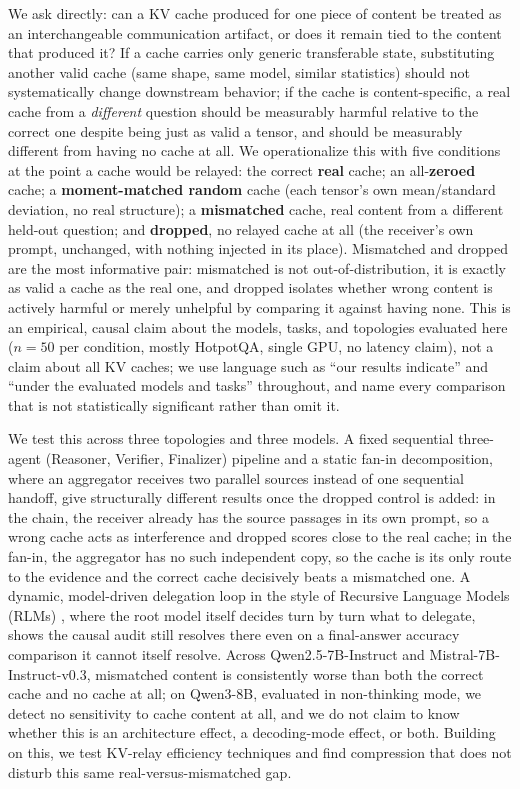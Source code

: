 \documentclass[11pt]{article}
\begin{document}
We ask directly: can a KV cache produced for one piece of content be
treated as an interchangeable communication artifact, or does it
remain tied to the content that produced it? If a cache carries only
generic transferable state, substituting another valid cache (same
shape, same model, similar statistics) should not systematically change
downstream behavior; if the cache is content-specific, a real cache
from a \emph{different} question should be measurably harmful relative
to the correct one despite being just as valid a tensor, and should be
measurably different from having no cache at all. We operationalize
this with five conditions at the point a cache would be relayed: the
correct \textbf{real} cache; an all-\textbf{zeroed} cache; a
\textbf{moment-matched random} cache (each tensor's own mean/standard
deviation, no real structure); a \textbf{mismatched} cache, real content
from a different held-out question; and \textbf{dropped}, no relayed
cache at all (the receiver's own prompt, unchanged, with nothing
injected in its place). Mismatched and dropped are the most
informative pair: mismatched is not out-of-distribution, it is exactly
as valid a cache as the real one, and dropped isolates whether wrong
content is actively harmful or merely unhelpful by comparing it against
having none. This is an empirical, causal claim about the models,
tasks, and topologies evaluated here ($n=50$ per condition, mostly
HotpotQA, single GPU, no latency claim), not a claim about all KV
caches; we use language such as ``our results indicate'' and ``under
the evaluated models and tasks'' throughout, and name every comparison
that is not statistically significant rather than omit it.

We test this across three topologies and three models. A fixed
sequential three-agent (Reasoner, Verifier, Finalizer) pipeline and a
static fan-in decomposition, where an aggregator receives two parallel
sources instead of one sequential handoff, give structurally different
results once the dropped control is added: in the chain, the receiver
already has the source passages in its own prompt, so a wrong cache
acts as interference and dropped scores close to the real cache; in
the fan-in, the aggregator has no such independent copy, so the cache
is its only route to the evidence and the correct cache decisively
beats a mismatched one. A dynamic, model-driven delegation loop in the
style of Recursive Language Models (RLMs) \citep{rlm2026}, where the
root model itself decides turn by turn what to delegate, shows the
causal audit still resolves there even on a final-answer accuracy
comparison it cannot itself resolve. Across Qwen2.5-7B-Instruct and
Mistral-7B-Instruct-v0.3, mismatched content is consistently worse than
both the correct cache and no cache at all; on Qwen3-8B, evaluated in
non-thinking mode, we detect no sensitivity to cache content at all,
and we do not claim to know whether this is an architecture effect, a
decoding-mode effect, or both. Building on this, we test KV-relay
efficiency techniques and find compression that does not disturb this
same real-versus-mismatched gap.
\end{document}
